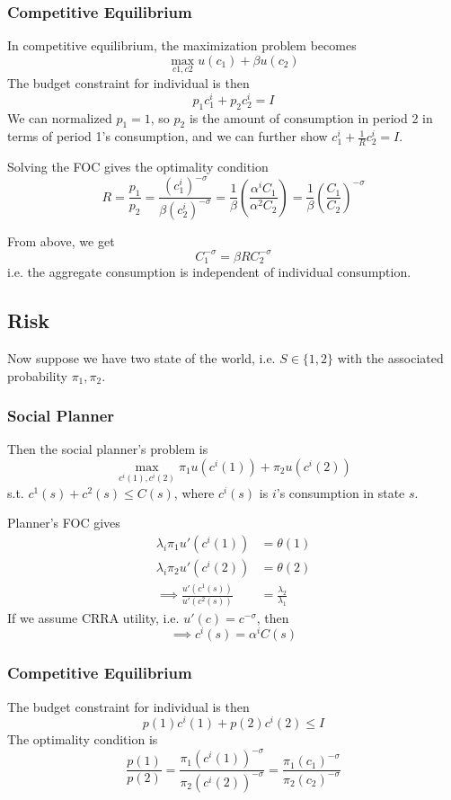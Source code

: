 \documentclass[twocolumn, fleqn]{article}
\numberwithin{equation}{section}
\begin{document}
	\subsubsection{Competitive Equilibrium}
	In competitive equilibrium, the maximization problem becomes
	\[ \max_{c1, c2}  u(c_1) + \beta u(c_2) \]
	The budget constraint for individual is then 
	\[p_1 c_1^i + p_2 c_2^i = I\]
	We can normalized $p_1=1$, so $p_2$ is the amount of consumption in period 2 in terms of period 1's consumption, and we can further show $c_1^i +\frac{1}{R}c_2^i =I$. 
	
	Solving the FOC gives the optimality condition
	\[R=\frac{p_1}{p_2} = \frac{(c_1^i)^{-\sigma}}{\beta(c_2^i)^{-\sigma}}= \frac{1}{\beta} \left(\frac{\alpha^i C_1}{\alpha^2 C_2} \right) =\frac{1}{\beta}\left( \frac{C_1}{C_2}\right)^{-\sigma}\]
	
	From above, we get 
	\[ C_1^{-\sigma} = \beta R C_2^{-\sigma}\]
	i.e. the aggregate consumption is independent of individual consumption.
	
	\subsection{Risk}
	Now suppose we have two state of the world, i.e. $S\in \{1,2\}$ with the associated probability $\pi_1, \pi_2$.
	\subsubsection{Social Planner}
	Then the social planner's problem is 
	\[ \max_{c^i(1), c^i(2)} \pi_1 u(c^i(1)) +\pi_2 u(c^i (2))\]
	s.t. $c^1(s) +c^2(s) \leq C(s)$, where $c^i(s)$ is $i$'s consumption in state $s$.
	
	Planner's FOC gives
	\begin{align*}
		\lambda_i \pi_1 u'(c^i(1)) &= \theta(1)\\
		\lambda_i \pi_2 u'(c^i(2)) &= \theta(2)\\
		\implies \frac{u'(c^1(s))}{u'(c^2(s))} &= \frac{\lambda_2}{\lambda_1}
	\end{align*}
	If we assume CRRA utility, i.e. $u'(c) = c^{-\sigma}$, then
	\[\implies c^i(s) = \alpha^i C(s)\]
	
	\subsubsection{Competitive Equilibrium}
	The budget constraint for individual is then 
	\[p(1) c^i(1) + p(2)c^i(2) \leq I\]
	The optimality condition is 
	\[ \frac{p(1)}{p(2)} = \frac{\pi_1(c^i(1))^{-\sigma}}{\pi_2(c^i(2))^{-\sigma}} = \frac{\pi_1(c_1)^{-\sigma}}{\pi_2(c_2)^{-\sigma}}\]
	
\end{document}
